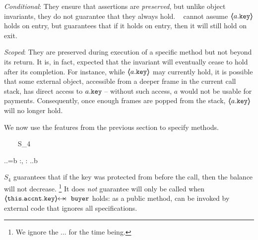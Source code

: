 \begin{customquote}
 \vspace{.05cm}
\noindent
\emph{Conditional}:   They ensure that assertions are \emph{preserved}, but unlike object invariants, they do not guarantee that they always hold.
\ \Eg   {} cannot assume $\langle\!\!\langle a.\mbox{\normalfont{\texttt{key}}} \rangle\!\!\rangle$ holds on entry, but   guarantees that if it holds on entry, then  it will still hold on exit.

\vspace{.05cm}
\noindent
\emph{Scoped}:  %
They are preserved during  execution of a specific method but not beyond its return. It is, in fact, expected that the invariant will eventually cease to hold after its completion. For instance, while $\langle\!\!\langle a.\mbox{\normalfont{\texttt{key}}} \rangle\!\!\rangle$ may currently hold, it is possible that some external object, accessible from a deeper frame in the current call stack, has direct access to $a.\mbox{\normalfont{\texttt{key}}}$ -- without such access, $a$ would not be usable for payments. Consequently, once enough frames are popped from the stack, $\langle\!\!\langle a.\mbox{\normalfont{\texttt{key}}} \rangle\!\!\rangle$  will no longer hold.

 \vspace{.05cm}
\noindent
{}
 \end{customquote}
 
 \begin{example}
 We   now use the features from the previous section to specify methods. 

{\sprepostShort
		{\strut \ \ \ \ S_4} 
		{    {} \wedge {}.\prg{\myAccount}.\prg{\balance}=b
		 }
		{} {} {:, : }
		{ 
		  .\prg{\myAccount}.\prg{\balance}\geq b
		} 
		}

\noindent
$S_4$  guarantees that if the  key was protected from  before the call, then the balance will not decrease. 
\footnote{We ignore the ... for the time being.}
 It does \emph{not} guarantee  will only be called when $\protectedFrom{\prg{this}.\prg{\myAccount}.\prg{key}} {\prg{buyer}}$ holds: 
as a  public method,    can be invoked by external code that ignores all specifications.
\end{example}

